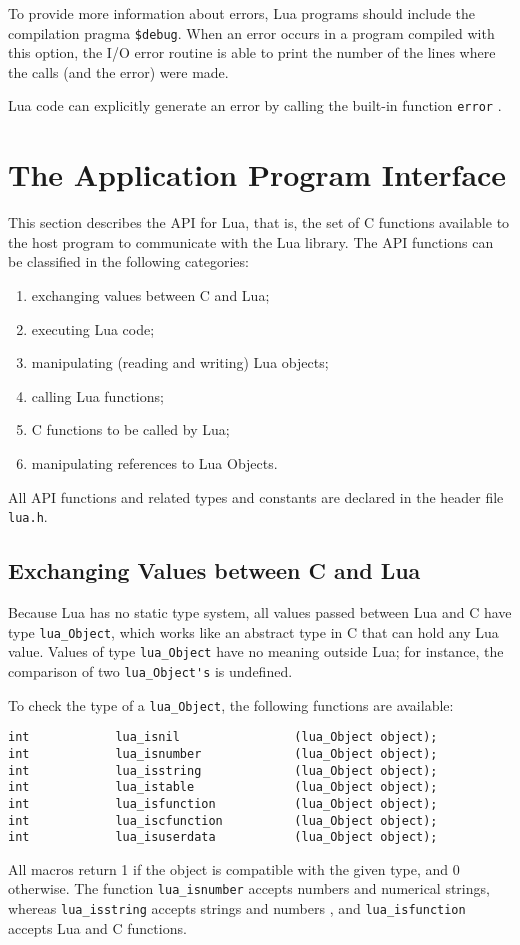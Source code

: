 To provide more information about errors,
Lua programs should include the compilation pragma \verb|$debug|.
\label{pragma}
When an error occurs in a program compiled with this option,
the I/O error routine is able to print the number of the
lines where the calls (and the error) were made.

Lua code can explicitly generate an error by calling the built-in
function \verb|error| .


\section{The Application Program Interface}

This section describes the API for Lua, that is,
the set of C functions available to the host program to communicate
with the Lua library.
The API functions can be classified in the following categories:
\begin{enumerate}
\item exchanging values between C and Lua;
\item executing Lua code;
\item manipulating (reading and writing) Lua objects;
\item calling Lua functions;
\item C functions to be called by Lua;
\item manipulating references to Lua Objects.
\end{enumerate}
All API functions and related types and constants
are declared in the header file \verb|lua.h|.

\subsection{Exchanging Values between C and Lua} \label{valuesCLua}
Because Lua has no static type system,
all values passed between Lua and C have type
\verb|lua_Object|,
which works like an abstract type in C that can hold any Lua value.
Values of type \verb|lua_Object| have no meaning outside Lua;
for instance,
the comparison of two \verb|lua_Object's| is undefined.

To check the type of a \verb|lua_Object|,
the following functions are available:
\begin{verbatim}
int            lua_isnil                (lua_Object object);
int            lua_isnumber             (lua_Object object);
int            lua_isstring             (lua_Object object);
int            lua_istable              (lua_Object object);
int            lua_isfunction           (lua_Object object);
int            lua_iscfunction          (lua_Object object);
int            lua_isuserdata           (lua_Object object);
\end{verbatim}
All macros return 1 if the object is compatible with the given type,
and 0 otherwise.
The function \verb|lua_isnumber| accepts numbers and numerical strings,
whereas
\verb|lua_isstring| accepts strings and numbers ,
and \verb|lua_isfunction| accepts Lua and C functions.


